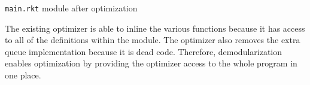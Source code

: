 \begin{listing}
  \inputminted{racket}{listings/main-optimized.rkt}
  \caption{\texttt{main.rkt} module after optimization}
  \label{lst:main-optimized.rkt}
\end{listing}

The existing optimizer is able to inline the various functions because it has access to all of the definitions within the module.
The optimizer also removes the extra queue implementation because it is dead code.
Therefore, demodularization enables optimization by providing the optimizer access to the whole program in one place.
